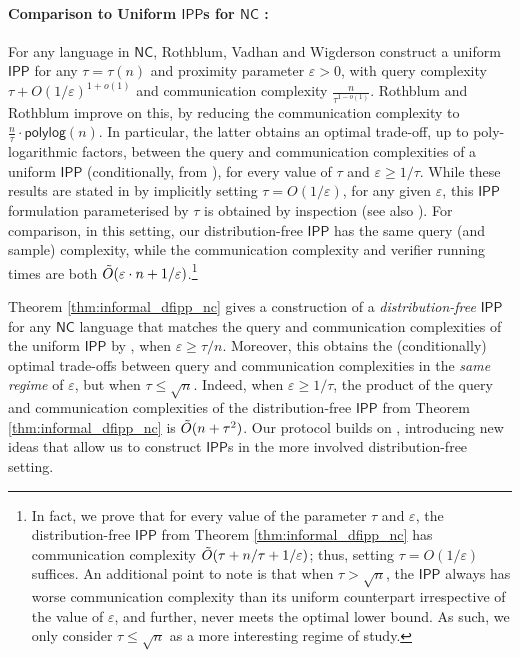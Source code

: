 \documentclass[11pt]{article}
\newcommand{\polylog}{\mathsf{polylog}}
\newcommand{\NC}{\mathsf{NC}}
\newcommand{\IPP}{\mathsf{IPP}}
\newcommand{\eps}{\varepsilon}
\begin{document}
\paragraph*{Comparison to Uniform $\IPP$s for $\NC$ \cite{RVW,RR20_batch_polylog}:} For any language in $\NC$, Rothblum, Vadhan and Wigderson \cite{RVW} construct a uniform $\IPP$ for any $\tau=\tau(n)$ and proximity parameter $\eps > 0$, with query complexity $\tau + O(1/\eps)^{1+o(1)}$ and communication complexity $\frac{n}{\tau^{1-o(1)}}$. Rothblum and Rothblum \cite{RR20_batch_polylog} improve on this, by reducing the communication complexity to $\frac{n}{\tau} \cdot \polylog(n)$. In particular, the latter obtains an optimal trade-off, up to poly-logarithmic factors, between the query and communication complexities of a uniform $\IPP$ (conditionally, from \cite{KR15}), for every value of $\tau$ and $\eps \geq 1/\tau$. While these results are stated in \cite{RVW,RR20_batch_polylog} by implicitly setting $\tau = O(1/\eps)$, for any given $\eps$, this $\IPP$ formulation parameterised by $\tau$ is obtained by inspection (see also \cite[Theorem 6.3]{GG21_universal}). For comparison, in this setting, our distribution-free $\IPP$ has the same query (and sample) complexity, while the communication complexity and verifier running times are both $\Tilde{O}(\eps\cdot n + 1/\eps)$.\footnote{In fact, we prove that for every value of the parameter $\tau$ and $\eps$, the distribution-free $\IPP$ from Theorem \ref{thm:informal_dfipp_nc} has communication complexity $\Tilde{O}(\tau+n/\tau+1/\eps)$; thus, setting $\tau = O(1/\eps)$ suffices. An additional point to note is that when $\tau > \sqrt{n}$, the $\IPP$ always has worse communication complexity than its uniform counterpart irrespective of the value of $\eps$, and further, never meets the optimal \cite{KR15} lower bound. As such, we only consider $\tau \leq \sqrt{n}$ as a more interesting regime of study.}

Theorem \ref{thm:informal_dfipp_nc} gives a construction of a \emph{distribution-free} $\IPP$ for any $\NC$ language that matches the query and communication complexities of the uniform $\IPP$ by \cite{RR20_batch_polylog}, when $\eps \geq \tau/n$. Moreover, this obtains the (conditionally) optimal trade-offs between query and communication complexities in the \textit{same regime} of $\eps$, but when $\tau \leq \sqrt{n}$. Indeed, when $\eps \geq 1/\tau$, the product of the query and communication complexities of the distribution-free $\IPP$ from Theorem \ref{thm:informal_dfipp_nc} is $\Tilde{O}(n + \tau^2)$. Our protocol builds on \cite{RVW}, introducing new ideas that allow us to construct $\IPP$s in the more involved distribution-free setting. 
\end{document}
